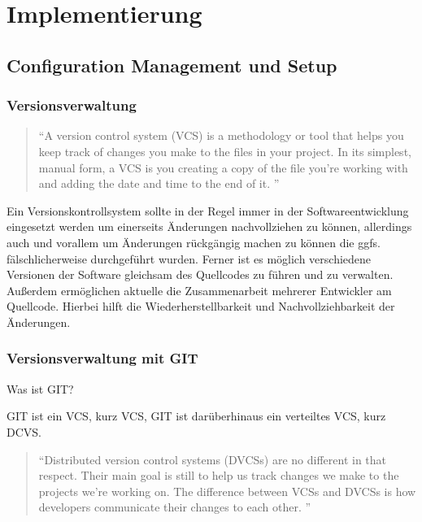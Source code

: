 \chapter{Implementierung} \label{kap:implementierung}

\section{Configuration Management und Setup}

\subsection{Versionsverwaltung}
\begin{quotation}
\enquote{A version control system (VCS) is a methodology or tool that helps you keep track of changes you make to the files in your project. In its simplest, manual form, a VCS is you creating a copy of the file you’re working with and adding the date and time to the end of it. \citep[S. 15][]{pragGit}}
\end{quotation}

Ein Versionskontrollsystem sollte in der Regel immer in der Softwareentwicklung eingesetzt werden um einerseits Änderungen nachvollziehen zu können, allerdings auch und vorallem um Änderungen rückgängig machen zu können die ggfs. fälschlicherweise durchgeführt wurden. Ferner ist es möglich verschiedene Versionen der Software gleichsam des Quellcodes zu führen und zu verwalten. Außerdem ermöglichen aktuelle  die Zusammenarbeit mehrerer Entwickler am Quellcode. Hierbei hilft die Wiederherstellbarkeit und Nachvollziehbarkeit der Änderungen. 

\subsection{Versionsverwaltung mit GIT}

Was ist GIT?

GIT ist ein \gls{VCS}, kurz VCS, GIT ist darüberhinaus ein verteiltes \gls{VCS}, kurz DCVS.

\begin{quotation}
\enquote{Distributed version control systems (DVCSs) are no different in that respect. Their main goal is still to help us track changes we make to the projects we’re working on. The difference between VCSs and DVCSs is how developers communicate their changes to each other. \citep[S. 15][]{pragGit}}
\end{quotation}

